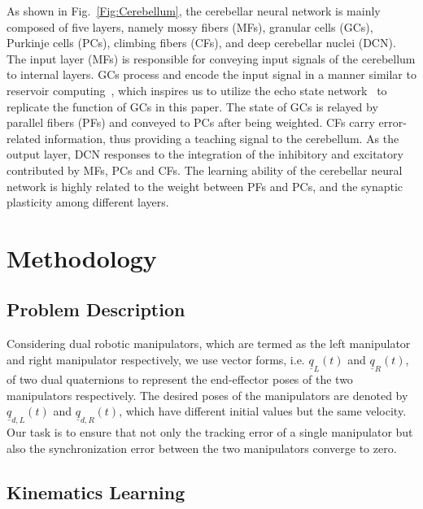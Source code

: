\documentclass[journal,twoside,web]{ieeecolor}
\begin{document}
As shown in Fig.~\ref{Fig:Cerebellum}, the cerebellar neural network is mainly composed of five layers, namely mossy fibers (MFs), granular cells (GCs), Purkinje cells (PCs), climbing fibers (CFs), and deep cerebellar nuclei (DCN). The input layer (MFs) is responsible for conveying input signals of the cerebellum to internal layers. GCs process and encode the input signal in a manner similar to reservoir computing~\cite{Kalidindi2019}, which inspires us to utilize the echo state network~\cite{Jaeger2007} to replicate the function of GCs in this paper. The state of GCs is relayed by parallel fibers (PFs) and conveyed to PCs after being weighted. CFs carry error-related information, thus providing a teaching signal to the cerebellum. As the output layer, DCN responses to the integration of the inhibitory and excitatory contributed by MFs, PCs and CFs. The learning ability of the cerebellar neural network is highly related to the weight between PFs and PCs, and the synaptic plasticity among different layers.


\section{Methodology} \label{section:methodology}


\subsection{Problem Description}

Considering dual robotic manipulators, which are termed as the left manipulator and right manipulator respectively, we use vector forms, i.e. $\underline{q}_L(t)$ and $\underline{q}_R(t)$, of two dual quaternions to represent the end-effector poses of the two manipulators respectively. The desired poses of the manipulators are denoted by $\underline{q}_{d,L}(t)$ and $\underline{q}_{d,R}(t)$, which have different initial values but the same velocity. Our task is to ensure that not only the tracking error of a single manipulator but also the synchronization error between the two manipulators converge to zero. 

\subsection{Kinematics Learning}
\end{document}
